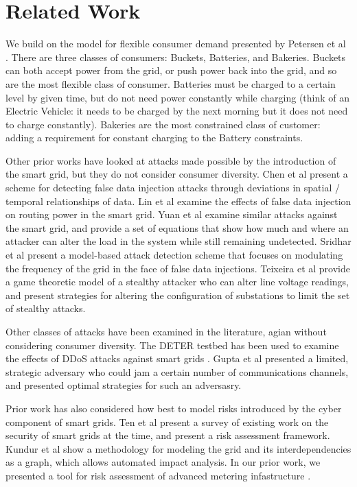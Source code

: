 \documentclass[conference]{IEEEtran}
\begin{document}
\section{Related Work}
\label{Related Work}

We build on the model for flexible consumer demand presented by Petersen et al \cite{petersen2013taxonomy}.  There are three classes of consumers: Buckets, Batteries, and Bakeries.  Buckets can both accept power from the grid, or push power back into the grid, and so are the most flexible class of consumer.  Batteries must be charged to a certain level by given time, but do not need power constantly while charging (think of an Electric Vehicle: it needs to be charged by the next morning but it does not need to charge constantly).  Bakeries are the most constrained class of customer: adding a requirement for constant charging to the Battery constraints.

Other prior works have looked at attacks made possible by the introduction of the smart grid, but they do not consider consumer diversity.  Chen et al \cite{chen2015detection} present a scheme for detecting false data injection attacks through deviations in spatial / temporal relationships of data.  Lin et al \cite{lin2012false} examine the effects of false data injection on routing power in the smart grid.  Yuan et al \cite{yuan2011modeling} examine similar attacks against the smart grid, and provide a set of equations that show how much and where an attacker can alter the load in the system while still remaining undetected.  Sridhar et al \cite{sridhar2014model} present a model-based attack detection scheme that focuses on modulating the frequency of the grid in the face of false data injections.  Teixeira et al \cite{teixeira2014security} provide a game theoretic model of a stealthy attacker who can alter line voltage readings, and present strategies for altering the configuration of substations to limit the set of stealthy attacks.  

Other classes of attacks have been examined in the literature, agian without considering consumer diversity.  The DETER testbed has been used to examine the effects of DDoS attacks against smart grids \cite{hussain2012ncs}.  Gupta et al \cite{gupta2010optimal} presented a limited, strategic adversary who could jam a certain number of communications channels, and presented optimal strategies for such an adversasry.  

Prior work has also considered how best to model risks introduced by the cyber component of smart grids.  Ten et al \cite{ten2010cybersecurity} present a survey of existing work on the security of smart grids at the time, and present a risk assessment framework.  Kundur et al \cite{kundur2010towards} show a methodology for modeling the grid and its interdependencies as a graph, which allows automated impact analysis.  In our prior work, we presented a tool for risk assessment of advanced metering infastructure \cite{shawly2014risk}.
\end{document}
